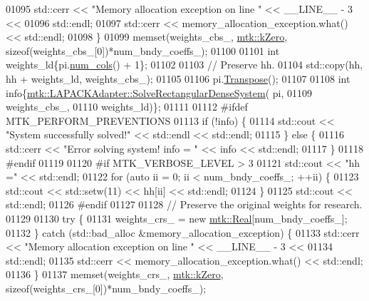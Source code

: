 \begin{DoxyCode}
{{01095     std::cerr << \textcolor{stringliteral}{"Memory allocation exception on line "} << \_\_LINE\_\_ - 3 <<
01096       std::endl;
01097     std::cerr << memory\_allocation\_exception.what() << std::endl;
01098   \}
01099   memset(weights\_cbs\_, \hyperlink{group__c01-roots_ga59a451a5fae30d59649bcda274fea271}{mtk::kZero}, \textcolor{keyword}{sizeof}(weights\_cbs\_[0])*num\_bndy\_coeffs\_);
01100 
01101   \textcolor{keywordtype}{int} weights\_ld\{pi.\hyperlink{classmtk_1_1DenseMatrix_a41747502d468c6728a4be31501b16e0e}{num\_cols}() + 1\};
01102 
01103   \textcolor{comment}{// Preserve hh.}
01104   std::copy(hh, hh + weights\_ld, weights\_cbs\_);
01105 
01106   pi.\hyperlink{classmtk_1_1DenseMatrix_a71d9c07ca66e88d97d1fd5012f43138b}{Transpose}();
01107 
01108   \textcolor{keywordtype}{int} info\{\hyperlink{classmtk_1_1LAPACKAdapter_a380f148ffdf96bae2f79ae28f1a6560c}{mtk::LAPACKAdapter::SolveRectangularDenseSystem}(
      pi,
01109                                                            weights\_cbs\_,
01110                                                            weights\_ld)\};
01111 
01112 \textcolor{preprocessor}{  #ifdef MTK\_PERFORM\_PREVENTIONS}
01113   \textcolor{keywordflow}{if} (!info) \{
01114     std::cout << \textcolor{stringliteral}{"System successfully solved!"} << std::endl << std::endl;
01115   \} \textcolor{keywordflow}{else} \{
01116     std::cerr << \textcolor{stringliteral}{"Error solving system! info = "} << info << std::endl;
01117   \}
01118 \textcolor{preprocessor}{  #endif}
01119 
01120 \textcolor{preprocessor}{  #if MTK\_VERBOSE\_LEVEL > 3}
01121   std::cout << \textcolor{stringliteral}{"hh ="} << std::endl;
01122   \textcolor{keywordflow}{for} (\textcolor{keyword}{auto} ii = 0; ii < num\_bndy\_coeffs\_; ++ii) \{
01123     std::cout << std::setw(11) << hh[ii] << std::endl;
01124   \}
01125   std::cout << std::endl;
01126 \textcolor{preprocessor}{  #endif}
01127 
01128   \textcolor{comment}{// Preserve the original weights for research.}
01129 
01130   \textcolor{keywordflow}{try} \{
01131     weights\_crs\_ = \textcolor{keyword}{new} \hyperlink{group__c01-roots_gac080bbbf5cbb5502c9f00405f894857d}{mtk::Real}[num\_bndy\_coeffs\_];
01132   \} \textcolor{keywordflow}{catch} (std::bad\_alloc &memory\_allocation\_exception) \{
01133     std::cerr << \textcolor{stringliteral}{"Memory allocation exception on line "} << \_\_LINE\_\_ - 3 <<
01134       std::endl;
01135     std::cerr << memory\_allocation\_exception.what() << std::endl;
01136   \}
01137   memset(weights\_crs\_, \hyperlink{group__c01-roots_ga59a451a5fae30d59649bcda274fea271}{mtk::kZero}, \textcolor{keyword}{sizeof}(weights\_crs\_[0])*num\_bndy\_coeffs\_);
}}
\end{DoxyCode}

